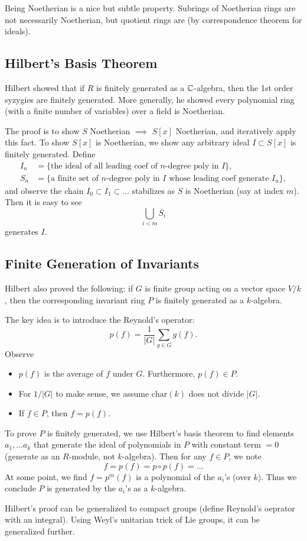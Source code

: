 Being Noetherian is a nice but subtle property. Subrings of Noetherian rings are not necessarily Noetherian, but quotient rings are (by correspondence theorem for ideals).

\subsection{Hilbert's Basis Theorem}
Hilbert showed that if $R$ is finitely generated as a ${\mathbb C}$-algebra, then the 1st order syzygies are finitely generated. More generally, he showed every polynomial ring (with a finite number of variables) over a field is Noetherian.

The proof is to show $S$ Noetherian $\implies$ $S[x]$ Noetherian, and iteratively apply this fact. To show $S[x]$ is Noetherian, we show any arbitrary ideal $I \subset S[x]$ is finitely generated. Define
\[
    \begin{split}
        I_n &= \{\text{the ideal of all leading coef of $n$-degree poly in } I \},\\
        S_n &= \{\text{a finite set of $n$-degree poly in $I$ whose leading coef generate } I_n \},
    \end{split}
\]
and observe the chain $I_0 \subset I_1 \subset \dots$ stabilizes as $S$ is Noetherian (say at index $m$). Then it is easy to see
\[
    \bigcup_{i < m} S_i
\]
generates $I$.

\subsection{Finite Generation of Invariants}
Hilbert also proved the following: if $G$ is finite group acting on a vector space $V/k$, then the corresponding invariant ring $P$ is finitely generated as a $k$-algebra.

The key idea is to introduce the Reynold's operator:
\[
    p(f) = \frac{1}{|G|} \sum_{g \in G} g(f).
\]
Observe
\begin{itemize}
    \item $p(f)$ is the average of $f$ under $G$. Furthermore, $p(f) \in P$.
    \item For $1/|G|$ to make sense, we assume $\text{char}(k)$ does not divide $|G|$.
    \item If $f \in P$, then $f = p(f)$.
\end{itemize}
To prove $P$ is finitely generated, we use Hilbert's basis theorem to find elements $a_1, \dots a_k$ that generate the ideal of polynomials in $P$ with constant term $ = 0$ (generate as an $R$-module, not $k$-algebra). Then for any $f \in P$, we note
\[
    f = p(f) = p \circ p(f) = \dots
\]
At some point, we find $f = p^m(f)$ is a polynomial of the $a_i$'s (over $k$). Thus we conclude $P$ is generated by the $a_i$'s as a $k$-algebra.

Hilbert's proof can be generalized to compact groups (define Reynold's oeprator with an integral). Using Weyl's unitarian trick of Lie groups, it can be generalized further.

